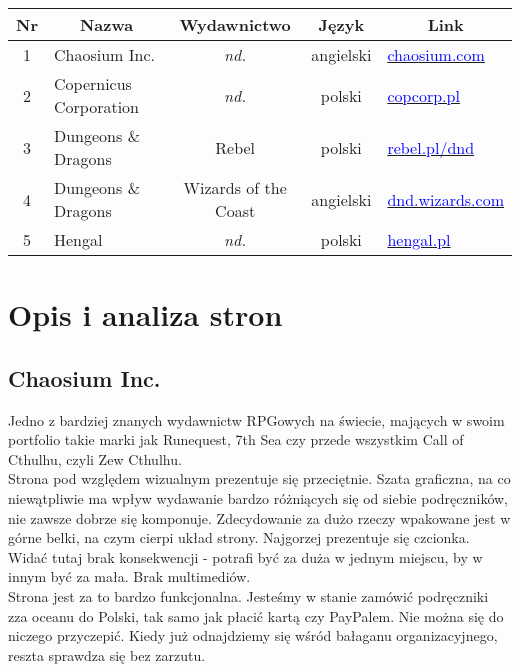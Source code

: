 \documentclass[a4paper,11pt]{article}
\begin{document}
\begin{tabular}{|c|l|c|c|l|}
	\hline
	\multicolumn{1}{|c}{\textbf{Nr}} & \multicolumn{1}{|c}{\textbf{Nazwa}} & \multicolumn{1}{|c}{\textbf{Wydawnictwo}} &\multicolumn{1}{|c}{\textbf{Język}} &\multicolumn{1}{|c|}{\textbf{Link}}\\
	\hline
	\hline
	1 & Chaosium Inc. & \textit{nd.} & angielski & \href{https://www.chaosium.com}{\textcolor{blue}{chaosium.com}} \\
	\hline
	2 & Copernicus Corporation & \textit{nd.} & polski & \href{https://copcorp.pl}{\textcolor{blue}{copcorp.pl}} \\
	\hline
	3 & Dungeons \& Dragons & Rebel & polski & \href{https://www.rebel.pl/dnd/}{\textcolor{blue}{rebel.pl/dnd}} \\
	\hline
	4 & Dungeons \& Dragons & Wizards of the Coast & angielski & \href{https://dnd.wizards.com}{\textcolor{blue}{dnd.wizards.com}} \\
	\hline
	5 & Hengal & \textit{nd.} & polski & \href{https://hengal.pl}{\textcolor{blue}{hengal.pl}} \\
	\hline
\end{tabular}

\newpage

\section {Opis i analiza stron}

\subsection {Chaosium Inc.}

Jedno z bardziej znanych wydawnictw RPGowych na świecie, mających w swoim portfolio takie marki jak Runequest, 7th Sea czy przede wszystkim Call of Cthulhu, czyli Zew Cthulhu.  \\

Strona pod względem wizualnym prezentuje się przeciętnie. Szata graficzna, na co niewątpliwie ma wpływ wydawanie bardzo różniących się od siebie podręczników, nie zawsze dobrze się komponuje. Zdecydowanie za dużo rzeczy wpakowane jest w górne belki, na czym cierpi układ strony. Najgorzej prezentuje się czcionka. Widać tutaj brak konsekwencji - potrafi być za duża w jednym miejscu, by w innym być za mała. Brak multimediów. \\

Strona jest za to bardzo funkcjonalna. Jesteśmy w stanie zamówić podręczniki zza oceanu do Polski, tak samo jak płacić kartą czy PayPalem. Nie można się do niczego przyczepić. Kiedy już odnajdziemy się wśród bałaganu organizacyjnego, reszta sprawdza się bez zarzutu. \\
\end{document}
